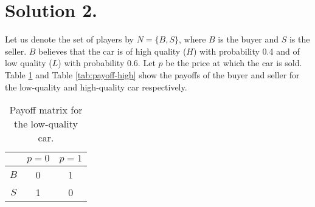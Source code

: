 \documentclass[9pt]{article}
\begin{document}
\section*{Solution 2.}
Let us denote the set of players by $N = \{ B, S \}$, where $B$ is the buyer and $S$ is the seller.
$B$ believes that the car is of high quality ($H$) with probability 0.4 and of low quality ($L$) with probability 0.6.
Let $p$ be the price at which the car is sold.
Table \ref{tab:payoff-low} and Table \ref{tab:payoff-high} show the payoffs of the buyer and seller for the low-quality and high-quality car respectively.
\begin{table}[htbp]
    \centering
    \begin{tabular}{c|cc}
        & $p = 0$ & $p = 1$ \\
        \hline
        $B$ & 0 & 1 \\
        $S$ & 1 & 0 \\
    \end{tabular}
    \caption{Payoff matrix for the low-quality car.}
    \label{tab:payoff-low}
\end{table}
\end{document}
